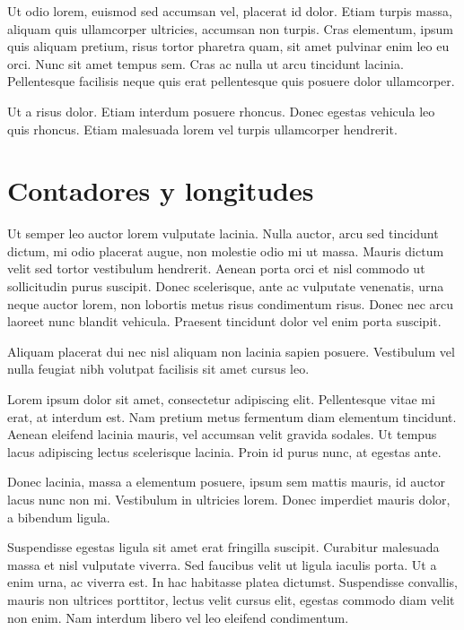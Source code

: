 \documentclass[12pt,a4paper]{report}
\begin{document}
Ut odio lorem, euismod sed accumsan vel, placerat id dolor. Etiam turpis massa, aliquam quis ullamcorper ultricies, accumsan non turpis. Cras elementum, ipsum quis aliquam pretium, risus tortor pharetra quam, sit amet pulvinar enim leo eu orci. Nunc sit amet tempus sem. Cras ac nulla ut arcu tincidunt lacinia. Pellentesque facilisis neque quis erat pellentesque quis posuere dolor ullamcorper. 

Ut a risus dolor. Etiam interdum posuere rhoncus. Donec egestas vehicula leo quis rhoncus. Etiam malesuada lorem vel turpis ullamcorper hendrerit.





\section{Contadores y longitudes}
\label{seccion.contadores}





Ut semper leo auctor lorem vulputate lacinia. Nulla auctor, arcu sed tincidunt dictum, mi odio placerat augue, non molestie odio mi ut massa. Mauris dictum velit sed tortor vestibulum hendrerit. Aenean porta orci et nisl commodo ut sollicitudin purus suscipit. Donec scelerisque, ante ac vulputate venenatis, urna neque auctor lorem, non lobortis metus risus condimentum risus. Donec nec arcu laoreet nunc blandit vehicula. Praesent tincidunt dolor vel enim porta suscipit. 

Aliquam placerat dui nec nisl aliquam non lacinia sapien posuere. Vestibulum vel nulla feugiat nibh volutpat facilisis sit amet cursus leo.

Lorem ipsum dolor sit amet, consectetur adipiscing elit. Pellentesque vitae mi erat, at interdum est. Nam pretium metus fermentum diam elementum tincidunt. Aenean eleifend lacinia mauris, vel accumsan velit gravida sodales. Ut tempus lacus adipiscing lectus scelerisque lacinia. Proin id purus nunc, at egestas ante. 

Donec lacinia, massa a elementum posuere, ipsum sem mattis mauris, id auctor lacus nunc non mi. Vestibulum in ultricies lorem. Donec imperdiet mauris dolor, a bibendum ligula.

Suspendisse egestas ligula sit amet erat fringilla suscipit. Curabitur malesuada massa et nisl vulputate viverra. Sed faucibus velit ut ligula iaculis porta. Ut a enim urna, ac viverra est. In hac habitasse platea dictumst. Suspendisse convallis, mauris non ultrices porttitor, lectus velit cursus elit, egestas commodo diam velit non enim. Nam interdum libero vel leo eleifend condimentum. 
\end{document}
